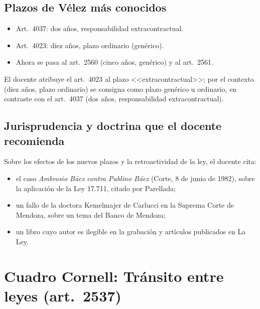 \documentclass[12pt,oneside]{book}
\begin{document}
\subsection{Plazos de V\'elez m\'as conocidos}

\begin{itemize}
  \item Art.\ 4037: dos a\~nos, responsabilidad extracontractual.
  \item Art.\ 4023: diez a\~nos, plazo ordinario (gen\'erico).
  \item Ahora se pasa al art.\ 2560 (cinco a\~nos, gen\'erico) y al art.\ 2561.
\end{itemize}

\begin{note}
El docente atribuye el art.\ 4023 al plazo <<extracontractual>>; por el contexto (diez a\~nos, plazo ordinario) se consigna como plazo gen\'erico u ordinario, en contraste con el art.\ 4037 (dos a\~nos, responsabilidad extracontractual).
\end{note}

\subsection{Jurisprudencia y doctrina que el docente recomienda}

Sobre los efectos de los nuevos plazos y la retroactividad de la ley, el docente cita:
\begin{itemize}
  \item el caso \textit{Ambrosio B\'aez contra Pablino B\'aez} (Corte, 8 de junio de 1982), sobre la aplicaci\'on de la Ley 17.711, citado por Parellada;
  \item un fallo de la doctora Kemelmajer de Carlucci en la Suprema Corte de Mendoza, sobre un tema del Banco de Mendoza;
  \item un libro cuyo autor es ilegible en la grabaci\'on y art\'iculos publicados en La Ley.
\end{itemize}

\section*{Cuadro Cornell: Tr\'ansito entre leyes (art.\ 2537)}
\end{document}
